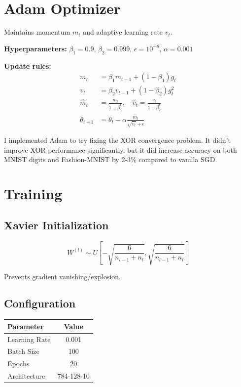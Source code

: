 \documentclass[11pt,a4paper]{article}
\begin{document}
\section{Adam Optimizer}

Maintains momentum $m_t$ and adaptive learning rate $v_t$.

\textbf{Hyperparameters:} $\beta_1 = 0.9$, $\beta_2 = 0.999$, $\epsilon = 10^{-8}$, $\alpha = 0.001$

\textbf{Update rules:}
\begin{align}
    m_t &= \beta_1 m_{t-1} + (1-\beta_1) g_t \\
    v_t &= \beta_2 v_{t-1} + (1-\beta_2) g_t^2 \\
    \hat{m}_t &= \frac{m_t}{1-\beta_1^t}, \quad \hat{v}_t = \frac{v_t}{1-\beta_2^t} \\
    \theta_{t+1} &= \theta_t - \alpha \frac{\hat{m}_t}{\sqrt{\hat{v}_t} + \epsilon}
\end{align}

I implemented Adam to try fixing the XOR convergence problem. It didn't improve XOR performance significantly, but it did increase accuracy on both MNIST digits and Fashion-MNIST by 2-3\% compared to vanilla SGD.

\section{Training}

\subsection{Xavier Initialization}

\begin{equation}
    W^{(l)} \sim U\left[-\sqrt{\frac{6}{n_{l-1} + n_l}}, \sqrt{\frac{6}{n_{l-1} + n_l}}\right]
\end{equation}

Prevents gradient vanishing/explosion.

\subsection{Configuration}

\begin{table}[h]
\centering
\begin{tabular}{lc}
\toprule
Parameter & Value \\
\midrule
Learning Rate & 0.001 \\
Batch Size & 100 \\
Epochs & 20 \\
Architecture & 784-128-10 \\
\bottomrule
\end{tabular}
\end{table}
\end{document}
